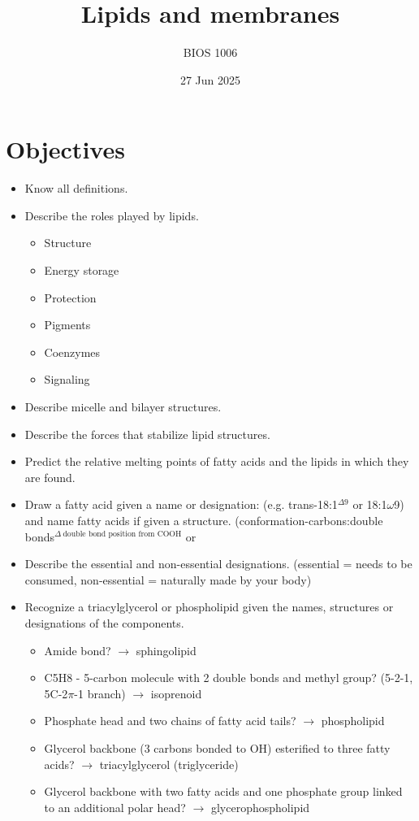 \documentclass[letterpaper, 12pt]{article}
\title{Lipids and membranes}
\author{BIOS 1006}
\date{27 Jun 2025}
\begin{document}
\maketitle

\section*{Objectives}

\begin{itemize}
\item Know all definitions.
\item Describe the roles played by lipids.
\begin{itemize}
\item Structure
\item Energy storage
\item Protection
\item Pigments
\item Coenzymes
\item Signaling
\end{itemize}
\item Describe micelle and bilayer structures.
\item Describe the forces that stabilize lipid structures.
\item Predict the relative melting points of fatty acids and the lipids in which they are found.
\item Draw a fatty acid given a name or designation: (e.g. trans-18:1$^{\Delta 9}$ or 18:1$\omega$9) and name fatty acids if given a structure. (conformation-carbons:double bonds$^{\Delta \: \text{double bond position from COOH}}$ or 
\item Describe the essential and non-essential designations. (essential = needs to be consumed, non-essential = naturally made by your body)
\item Recognize a triacylglycerol or phospholipid given the names, structures or designations of the components.
\begin{itemize}
\item Amide bond? $\to$ sphingolipid
\item C5H8 - 5-carbon molecule with 2 double bonds and methyl group? (5-2-1, 5C-2$\pi$-1 branch) $\to$ isoprenoid
\item Phosphate head and two chains of fatty acid tails? $\to$ phospholipid
\item Glycerol backbone (3 carbons bonded to OH) esterified to three fatty acids? $\to$ triacylglycerol (triglyceride)
\item Glycerol backbone with two fatty acids and one phosphate group linked to an additional polar head? $\to$ glycerophospholipid

\end{itemize}
\end{itemize}
\end{document}
